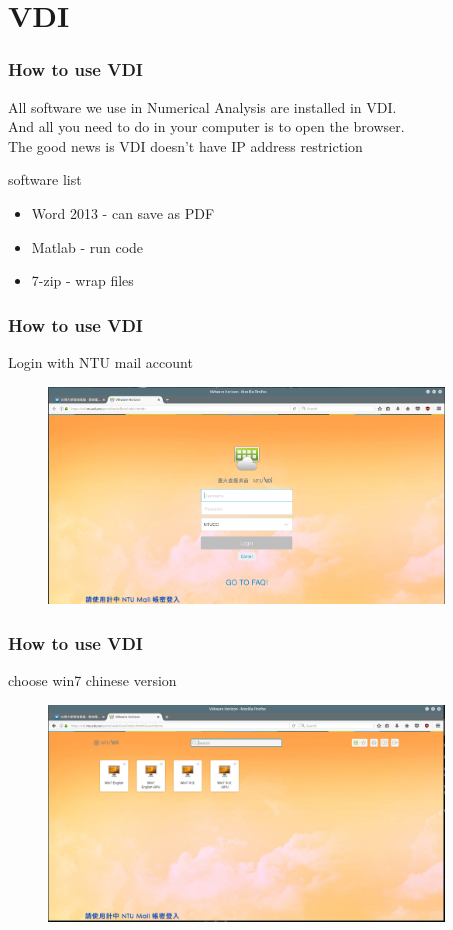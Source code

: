 \documentclass [12pt] {beamer}
\begin{document}
    \section {VDI}
    \begin {frame}
        \frametitle {How to use VDI}
        All software we use in Numerical Analysis are installed in VDI.\\
        And all you need to do in your computer is to open the \alert{browser}.\\
        \vspace {18pt}
        The good news is VDI doesn't have IP address restriction
        \vspace {24pt}
        \begin {block} {software list}
        \begin {itemize}
            \item Word 2013 - can save as PDF
            \item Matlab - run code
            \item 7-zip - wrap files
        \end {itemize}
        \end {block}
    \end {frame}
    \begin {frame}
        \frametitle {How to use VDI}
        Login with NTU mail account
        \begin {figure}
        \begin {center}
            \includegraphics [width=10.5cm] {fig1}
        \end {center}
        \end {figure}
    \end {frame}
    \begin {frame}
        \frametitle {How to use VDI}
        choose win7 chinese version
        \begin {figure}
        \begin {center}
            \includegraphics [width=10.5cm] {fig2}
        \end {center}
        \end {figure}
    \end {frame}
\end{document}
